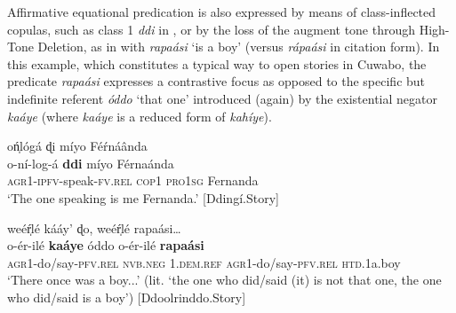 \documentclass[output=paper,colorlinks=true, citecolor=brown,draftmode]{langscibook}
\begin{document}
Affirmative equational predication is also expressed by means of class-inflected copulas, such as class 1 \textit{ddi} in , or by the loss of the augment tone through High-Tone Deletion, as in  with \textit{rapaási} ‘is a boy’ (versus \textit{rápaási} in citation form). In this example, which constitutes a typical way to open stories in Cuwabo, the predicate \textit{rapaási} expresses a contrastive focus as opposed to the specific but indefinite referent \textit{óddo} ‘that one’ introduced (again) by the existential negator \textit{kaáye} (where \textit{kaáye} is a reduced form of \textit{kahíye}).

\ea\label{ex:cuw:15} oń̩lógá ɖi míyo Féŕnáânda\\ 
    \gll o-ní-log-á \textbf{ddi} míyo Férnaánda\\
         \textsc{agr1-ipfv}{}-speak\textsc{{}-fv.rel} \textsc{cop1} \textsc{pro1sg} Fernanda \\
    \glt ‘The one speaking is me Fernanda.’ [Ddingí.Story]
\z 

\ea\label{ex:cuw:16} weéŕ̩lé kááy’ ɖo, weéŕ̩lé rapaási…  \\
    \gll  o-ér-ilé \textbf{kaáye} óddo o-ér-ilé \textbf{rapaási} \\
          \textsc{agr1-}do/say-\textsc{pfv}.\textsc{rel} \textsc{nvb.neg} 1.\textsc{dem.ref} \textsc{agr1-}do/say-\textsc{pfv}.\textsc{rel} \textsc{htd}.1a.boy \\
    \glt ‘There once was a boy...’ (lit. ‘the one who did/said (it) is not that one, the one who did/said is a boy’) [Ddoolrinddo.Story]
\z 
\end{document}
